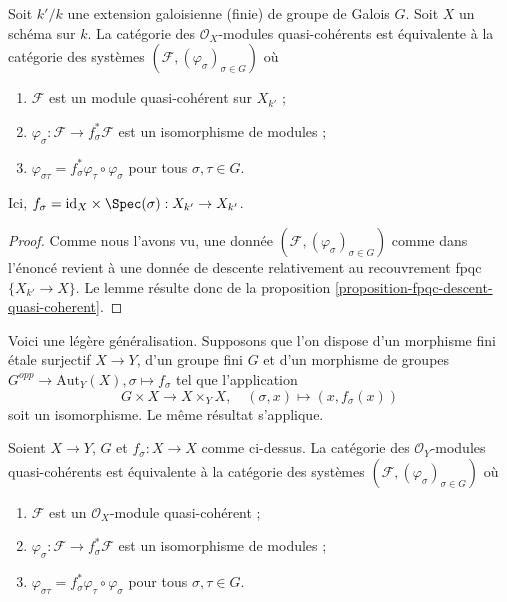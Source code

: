 \begin{lemma}
\label{lemma-galois-descent}
Soit $k'/k$ une extension galoisienne (finie) de groupe de Galois $G$.
Soit $X$ un schéma sur $k$. La catégorie des $\mathcal{O}_X$-modules
quasi-cohérents est équivalente à la catégorie des systèmes
$(\mathcal{F}, (\varphi_\sigma)_{\sigma \in G})$ où
\begin{enumerate}
\item $\mathcal{F}$ est un module quasi-cohérent sur $X_{k'}$ ;
\item $\varphi_\sigma : \mathcal{F} \to f_\sigma^*\mathcal{F}$
est un isomorphisme de modules ;
\item $\varphi_{\sigma\tau} = f_\sigma^*\varphi_\tau \circ \varphi_\sigma$
pour tous $\sigma, \tau \in G$.
\end{enumerate}
Ici, $f_\sigma = \text{id}_X \times \Spec(\sigma) : X_{k'} \to X_{k'}$.
\end{lemma}

\begin{proof}
Comme nous l'avons vu, une donnée
$(\mathcal{F}, (\varphi_\sigma)_{\sigma \in G})$ comme dans l'énoncé
revient à une donnée de descente relativement au recouvrement fpqc
$\{X_{k'} \to X\}$. Le lemme résulte donc de la proposition
\ref{proposition-fpqc-descent-quasi-coherent}.
\end{proof}

\noindent
Voici une légère généralisation. Supposons que l'on dispose d'un morphisme
fini \'etale surjectif $X \to Y$, d'un groupe fini $G$ et d'un morphisme de groupes
$G^{opp} \to \text{Aut}_Y(X), \sigma \mapsto f_\sigma$
tel que l'application
$$
G \times X \longrightarrow X \times_Y X,\quad
(\sigma, x) \longmapsto (x, f_\sigma(x))
$$
soit un isomorphisme. Le même résultat s'applique.

\begin{lemma}
\label{lemma-galois-descent-more-general}
Soient $X \to Y$, $G$ et $f_\sigma : X \to X$ comme ci-dessus.
La catégorie des $\mathcal{O}_Y$-modules quasi-cohérents est équivalente
à la catégorie des systèmes $(\mathcal{F}, (\varphi_\sigma)_{\sigma \in G})$ où
\begin{enumerate}
\item $\mathcal{F}$ est un $\mathcal{O}_X$-module quasi-cohérent ;
\item $\varphi_\sigma : \mathcal{F} \to f_\sigma^*\mathcal{F}$
est un isomorphisme de modules ;
\item $\varphi_{\sigma\tau} = f_\sigma^*\varphi_\tau \circ \varphi_\sigma$
pour tous $\sigma, \tau \in G$.
\end{enumerate}
\end{lemma}

